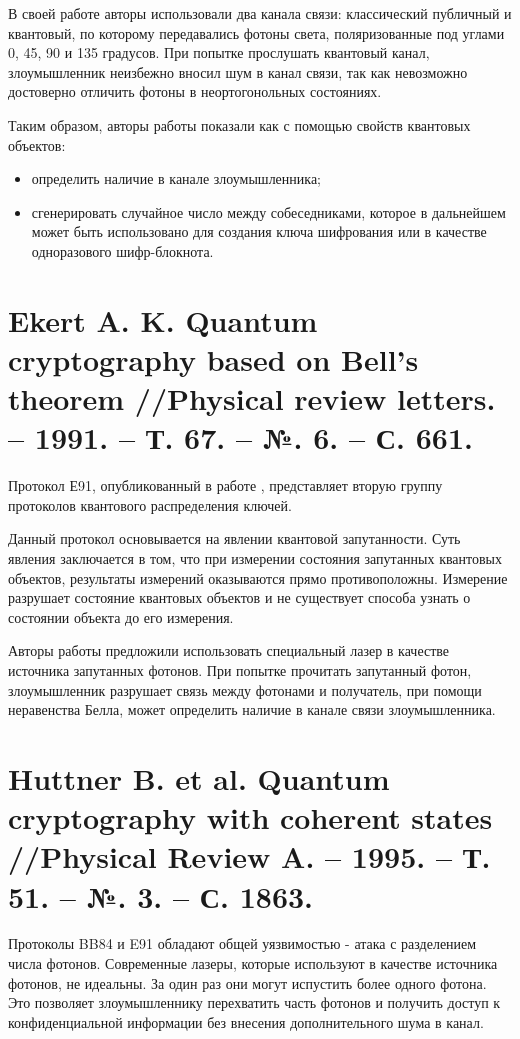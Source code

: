 В своей работе авторы использовали два канала связи: классический публичный и квантовый, по которому передавались фотоны света, поляризованные под углами 0, 45, 90 и 135 градусов. При попытке прослушать квантовый канал, злоумышленник неизбежно вносил шум в канал связи, так как невозможно достоверно отличить фотоны в неортогонольных состояниях.

Таким образом, авторы работы показали как с помощью свойств квантовых объектов:
\begin{itemize}
	\item определить наличие в канале злоумышленника;
	\item сгенерировать случайное число между собеседниками, которое в дальнейшем может быть использовано для создания ключа шифрования или в качестве одноразового шифр-блокнота.
\end{itemize}

\section{Ekert A. K. Quantum cryptography based on Bell’s theorem //Physical review letters. – 1991. – Т. 67. – №. 6. – С. 661.}
Протокол Е91, опубликованный в работе \cite{ekert1991quantum}, представляет вторую группу протоколов квантового распределения ключей.

Данный протокол основывается на явлении квантовой запутанности. Суть явления заключается в том, что при измерении состояния запутанных квантовых объектов, результаты измерений оказываются прямо противоположны. Измерение разрушает состояние квантовых объектов и не существует способа узнать о состоянии объекта до его измерения.

Авторы работы предложили использовать специальный лазер в качестве источника запутанных фотонов. При попытке прочитать запутанный фотон, злоумышленник разрушает связь между фотонами и получатель, при помощи неравенства Белла, может определить наличие в канале связи злоумышленника.


\section{Huttner B. et al. Quantum cryptography with coherent states //Physical Review A. – 1995. – Т. 51. – №. 3. – С. 1863.}
Протоколы BB84 и E91 обладают общей уязвимостью - атака с разделением числа фотонов. Современные лазеры, которые используют в качестве источника фотонов, не идеальны. За один раз они могут испустить более одного фотона. Это позволяет злоумышленнику перехватить часть фотонов и получить доступ к конфиденциальной информации без внесения дополнительного шума в канал.

